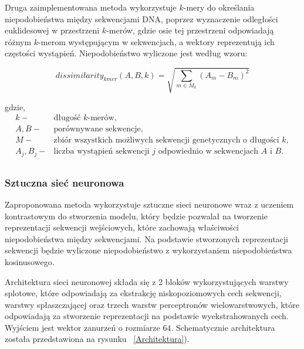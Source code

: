                 Druga zaimplementowana metoda wykorzystuje $k$-mery do określania niepodobieństwa między sekwencjami DNA, poprzez wyznaczenie odległości euklidesowej w przestrzeni $k$-merów, gdzie osie tej przestrzeni odpowiadają różnym $k$-merom występującym w sekwencjach, a wektory reprezentują ich częstości wystąpień. Niepodobieństwo wyliczone jest według wzoru:
    
                \begin{equation}
                    dissimilarity_{kmer}(A, B, k) = \sqrt{\sum_{m \in M_{k}} (A_m - B_m)^{2}}
                \end{equation}
    
                gdzie,
                \begin{align*} 
                    k -& \text{długość $k$-merów}, \\
                    A, B -& \text{porównywane sekwencje}, \\
                    M -& \text{zbiór wszystkich możliwych sekwencji genetycznych o długości $k$}, \\
                    A_j, B_j -& \text{liczba wystąpień sekwencji } j \text{ odpowiednio w sekwencjach } A \text{ i } B. \\
                \end{align*}
            
            \subsubsection{Sztuczna sieć neuronowa}
            
                Zaproponowana metoda wykorzystuje sztuczne sieci neuronowe wraz z uczeniem kontrastowym do stworzenia modelu, który będzie pozwalał na tworzenie reprezentacji sekwencji wejściowych, które zachowają właściwości niepodobieństwa między sekwencjami. Na podstawie stworzonych reprezentacji sekwencji będzie wyliczone niepodobieństwo z wykorzystaniem niepodobieństwa kosinusowego.
    
    
                    Architektura sieci neuronowej składa się z 2 bloków wykorzystujących warstwy splotowe, które odpowiadają za ekstrakcję niskopoziomowych cech sekwencji, warstwy spłaszczającej oraz trzech warstw perceptronów wielowarstwowych, które odpowiadają za stworzenie reprezentacji na podstawie wyekstrahowanych cech. Wyjściem jest wektor zanurzeń o rozmiarze $64$. Schematycznie architektura została przedstawiona na rysunku ~\ref{Architektura}).
    
